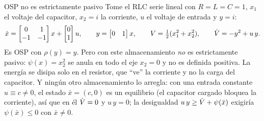 \begin{trampa}[label=tr:pa-osp]{OSP no es estrictamente pasivo}
Tome el RLC serie lineal con $R=L=C=1$, $x_1$ el voltaje del capacitor, $x_2=i$ la corriente, $u$ el voltaje de entrada y $y=i$:
\[
  \dot x=\begin{bmatrix}0&1\\-1&-1\end{bmatrix}x+\begin{bmatrix}0\\1\end{bmatrix}u,\qquad y=\begin{bmatrix}0&1\end{bmatrix}x,
  \qquad V=\tfrac12(x_1^2+x_2^2),\qquad \dot V=-y^2+u\,y .
\]
Es OSP con $\rho(y)=y$. Pero con este almacenamiento \emph{no} es estrictamente pasivo: $\psi(x)=x_2^2$ se anula en todo el eje $x_2=0$ y no es definida positiva. La energía se disipa solo en el resistor, que ``ve'' la corriente y no la carga del capacitor. Y ningún otro almacenamiento lo arregla: con una entrada constante $u\equiv c\neq0$, el estado $\bar x=(c,0)$ es un equilibrio (el capacitor cargado bloquea la corriente), así que en él $\dot V=0$ y $u\,y=0$; la desigualdad $u\,y\ge\dot V+\psi(\bar x)$ exigiría $\psi(\bar x)\le0$ con $\bar x\neq0$.
\end{trampa}
